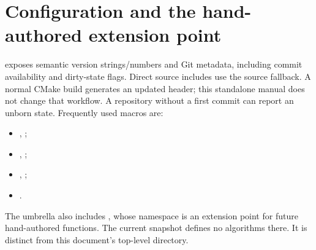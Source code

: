 \section{Configuration and the hand-authored extension point}
 exposes semantic version strings/numbers and Git metadata,
including commit availability and dirty-state flags. Direct source includes
use the source fallback. A normal CMake build generates an updated header;
this standalone manual does not change that workflow. A repository without a
first commit can report an unborn state. Frequently used macros are:
\begin{itemize}
\item {}, ;
\item {}, ;
\item {}, ;
\item {}.
\end{itemize}

The umbrella also includes , whose
 namespace is an extension point for future hand-authored
functions. The current snapshot defines no algorithms there. It is distinct
from this document's top-level  directory.
